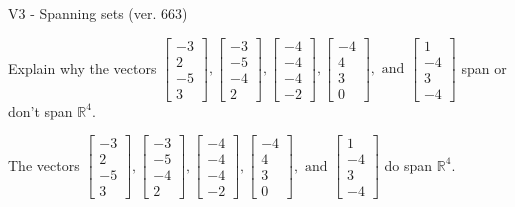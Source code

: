 \begin{exercise}
  \begin{exerciseTitle}V3 - Spanning sets (ver. 663)\end{exerciseTitle}
  \begin{exerciseStatement}
    Explain why the vectors \(\left[\begin{array}{r}
-3 \\
2 \\
-5 \\
3
\end{array}\right] , \left[\begin{array}{r}
-3 \\
-5 \\
-4 \\
2
\end{array}\right] , \left[\begin{array}{r}
-4 \\
-4 \\
-4 \\
-2
\end{array}\right] , \left[\begin{array}{r}
-4 \\
4 \\
3 \\
0
\end{array}\right] , \text{ and } \left[\begin{array}{r}
1 \\
-4 \\
3 \\
-4
\end{array}\right]\) span or don't span \(\mathbb{R}^4\). 
	


  \end{exerciseStatement}
  \begin{exerciseAnswer}
   The vectors \(\left[\begin{array}{r}
-3 \\
2 \\
-5 \\
3
\end{array}\right] , \left[\begin{array}{r}
-3 \\
-5 \\
-4 \\
2
\end{array}\right] , \left[\begin{array}{r}
-4 \\
-4 \\
-4 \\
-2
\end{array}\right] , \left[\begin{array}{r}
-4 \\
4 \\
3 \\
0
\end{array}\right] , \text{ and } \left[\begin{array}{r}
1 \\
-4 \\
3 \\
-4
\end{array}\right]\) 
  	 do  
	span \(\mathbb{R}^4\).
  



\end{exerciseAnswer}
\end{exercise}
